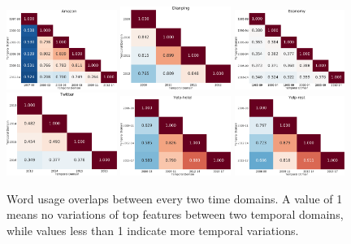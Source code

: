 \begin{figure}[tb!]
\centering
\includegraphics[width=0.32\textwidth]{images/chapter3/lang_use/amazon.pdf}
\includegraphics[width=0.32\textwidth]{images/chapter3/lang_use/dianping.pdf}
\includegraphics[width=0.32\textwidth]{images/chapter3/lang_use/economy.pdf}
\newline
\includegraphics[width=0.32\textwidth]{images/chapter3/lang_use/vaccine.pdf}
\includegraphics[width=0.32\textwidth]{images/chapter3/lang_use/yelp_hotel.pdf}
\includegraphics[width=0.32\textwidth]{images/chapter3/lang_use/yelp_rest.pdf}
\caption{Word usage overlaps between every two time domains. A value of 1 means no variations of top features between two temporal domains, while values less than 1 indicate more temporal variations.}
\label{chap3:fig:lang}
\end{figure}

